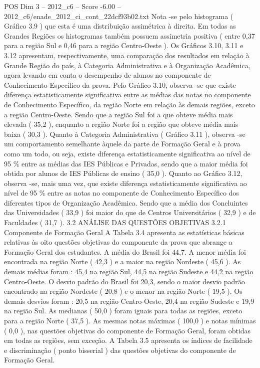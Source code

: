 \begin{textsample}{POS Dim 3 – 2012\_c6 – Score -6.00 – 2012\_c6/enade\_2012\_ci\_cont\_22dcf93b02.txt}
Nota -se pelo histograma ( Gráfico 3.9 ) que esta é uma distribuição assimétrica à direita.
Em todas as Grandes Regiões os histogramas também possuem assimetria positiva ( entre 0,37 para a região Sul e 0,46 para a região Centro-Oeste ).
Os Gráficos 3.10, 3.11 e 3.12 apresentam, respectivamente, uma comparação dos resultados em relação à Grande Região do país, à Categoria Administrativa e à Organização Acadêmica, agora levando em conta o desempenho de alunos no componente de Conhecimento Específico da prova.
Pelo Gráfico 3.10, observa -se que existe diferença estatisticamente significativa entre as médias das notas no componente de Conhecimento Específico, da região Norte em relação às demais regiões, exceto a região Centro-Oeste.
Sendo que a região Sul foi a que obteve média mais elevada ( 35,2 ), enquanto a região Norte foi a região que obteve média mais baixa ( 30,3 ).
Quanto à Categoria Administrativa ( Gráfico 3.11 ), observa -se um comportamento semelhante àquele da parte de Formação Geral e à prova como um todo, ou seja, existe diferença estatisticamente significativa ao nível de 95 \% entre as médias das IES Públicas e Privadas, sendo que a maior média foi obtida por alunos de IES Públicas de ensino ( 35,0 ).
Quanto ao Gráfico 3.12, observa -se, mais uma vez, que existe diferença estatisticamente significativa ao nível de 95 \% entre as notas no componente de Conhecimento Específico dos diferentes tipos de Organização Acadêmica.
Sendo que a média dos Concluintes das Universidades ( 33,9 ) foi maior do que de Centros Universitários ( 32,9 ) e de Faculdades ( 31,7 ). 3.2 ANÁLISE DAS QUESTÕES OBJETIVAS 3.2.1 Componente de Formação Geral A Tabela 3.4 apresenta as estatísticas básicas relativas às oito questões objetivas do componente da prova que abrange a Formação Geral dos estudantes.
A média do Brasil foi 44,7.
A menor média foi encontrada na região Norte ( 42,3 ) e a maior na região Nordeste ( 45,6 ).
As demais médias foram : 45,4 na região Sul, 44,5 na região Sudeste e 44,2 na região Centro-Oeste.
O desvio padrão do Brasil foi 20,3, sendo o maior desvio padrão encontrado na região Nordeste ( 20,8 ) e o menor na região Norte ( 19,5 ).
Os demais desvios foram : 20,5 na região Centro-Oeste, 20,4 na região Sudeste e 19,9 na região Sul.
As medianas ( 50,0 ) foram iguais para todas as regiões, exceto para a região Norte ( 37,5 ).
As mesmas notas máximas ( 100,0 ) e notas mínimas ( 0,0 ), nas questões objetivas do componente de Formação Geral, foram obtidas em todas as regiões, sem exceção.
A Tabela 3.5 apresenta os índices de facilidade e discriminação ( ponto bisserial ) das questões objetivas do componente de Formação Geral.

\end{textsample}
